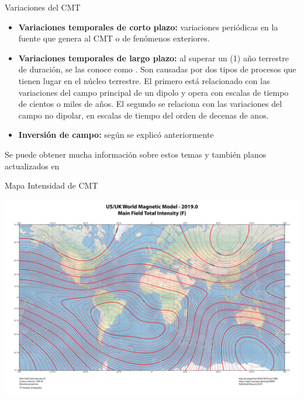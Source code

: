 \begin{frame}

  \begin{block}{Variaciones del CMT}{\small
    \begin{itemize}
    \item {\bf Variaciones temporales de corto plazo:} variaciones peri\'odicas en la fuente que genera
	al CMT o de fen\'omenos exteriores.
    \item {\bf Variaciones temporales de largo plazo:} al superar un (1) a\~no terrestre de duraci\'on,
	se las conoce como . Son causadas por dos tipos de procesos que tienen lugar en el n\'ucleo terrestre. El primero est\'a  relacionado con las variaciones del campo principal de un dipolo y opera con escalas de tiempo de cientos o miles de a\~nos. El segundo se relaciona con las variaciones del campo no dipolar, en escalas de tiempo del orden de decenas de anos.
    \item {\bf Inversi\'on de campo:} seg\'un se explic\'o anteriormente
    \end{itemize}
}
  \end{block}
\vspace{0.3mm}
Se puede obtener mucha informaci\'on sobre estos temas y tambi\'en planos actualizados en  \href{https://www.ngdc.noaa.gov/ngdc.html}{}

\end{frame}

\begin{frame}{Mapa Intensidad de CMT}
    
 \includegraphics[width=\linewidth]{05.instrumentos.giroscopicos.imagenes/05.04.MagnetismoTerrestre/05-04-mapa_intensidad.pdf}  

\end{frame}

